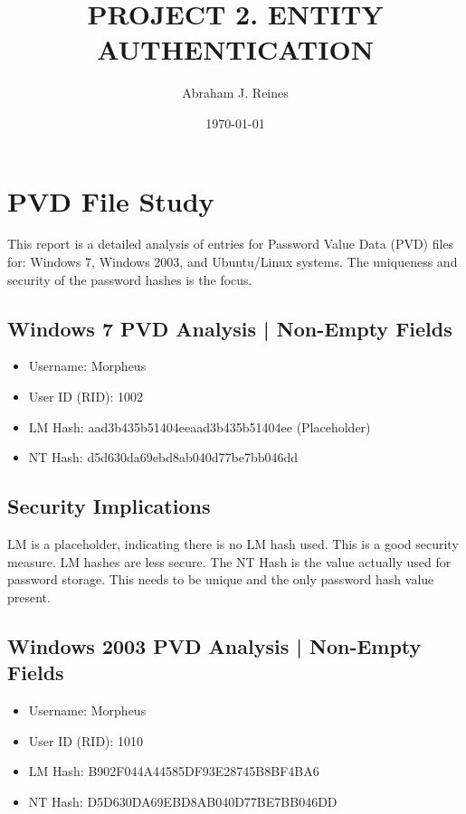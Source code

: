 \documentclass{article}
\title{PROJECT 2. ENTITY AUTHENTICATION}
\author{Abraham J. Reines}
\date{\today}
\begin{document}
\maketitle

\section{PVD File Study}

This report is a detailed analysis of entries for Password Value Data (PVD) files for: Windows 7, Windows 2003, and Ubuntu/Linux systems. The uniqueness and security of the password hashes is the focus. 

\subsection{Windows 7 PVD Analysis | Non-Empty Fields}
\begin{itemize}
    \item Username: Morpheus 
    \item User ID (RID): 1002
    \item LM Hash: aad3b435b51404eeaad3b435b51404ee (Placeholder)
    \item NT Hash: d5d630da69ebd8ab040d77be7bb046dd
\end{itemize}

\subsection{Security Implications}

LM is a placeholder, indicating there is no LM hash used. This is a good security measure. LM hashes are less secure. The NT Hash is the value actually used for password storage. This needs to be unique and the only password hash value present. 

\subsection{Windows 2003 PVD Analysis | Non-Empty Fields}
\begin{itemize}
    \item Username: Morpheus
    \item User ID (RID): 1010
    \item LM Hash: B902F044A44585DF93E28745B8BF4BA6
    \item NT Hash: D5D630DA69EBD8AB040D77BE7BB046DD
\end{itemize}
\end{document}
